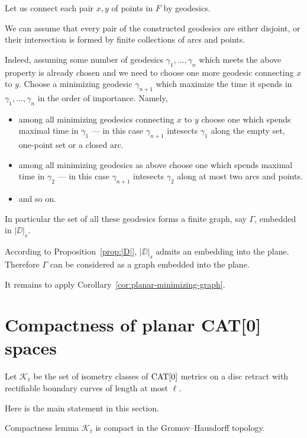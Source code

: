\documentclass[a4paper,10pt]{amsart}
\begin{document}
Let us connect each pair $x,y$ of points in $F$ by geodesics.

We can assume that 
every pair of the constructed geodesics 
are either disjoint, or their intersection is formed by finite collections of arcs and points.

Indeed, assuming some number of geodesics $\gamma_1,\dots,\gamma_n$ which meets the above property is already chosen and we need to choose one more geodesic connecting $x$ to $y$.
Choose a minimizing geodesic $\gamma_{n+1}$ which maximize the time it spends in $\gamma_1,\dots,\gamma_n$  in the order of importance.
Namely, 
\begin{itemize}
\item  among all minimizing geodesics connecting $x$ to $y$
choose one which spends maximal time in $\gamma_1$ --- in this case $\gamma_{n+1}$ intesects $\gamma_1$ along the empty set, one-point set or a closed arc.
\item among all minimizing geodesics as above
choose one which spends maximal time in $\gamma_2$ --- in this case $\gamma_{n+1}$ intesects $\gamma_2$ along at most two arcs and points.
\item and so on.
\end{itemize}


In particular the set of all these geodesics forms a finite graph, say $\Gamma$,
embedded in $|\DD|_s$. 

According to Proposition~\ref{prop:|D|},
$|\DD|_s$ admits an embedding into the plane.
Therefore $\Gamma$ can be considered as a graph embedded into the plane.

It remains to apply Corollary~\ref{cor:planar-minimizing-graph}.
\qeds

\section{Compactness of planar CAT[0] spaces}

Let $\mathcal{K}_\ell$ be the set of isometry classes of $\mathop{\rm CAT}\nolimits[0]$ metrics on a disc retract with rectifiable
boundary curves of length at most $\ell$.


Here is the main statement in this section.

\begin{thm}{Compactness lemma}\label{lem:compact}
$\mathcal{K}_\ell$ is compact in the Gromov--Hausdorff topology.
\end{thm}
\end{document}
